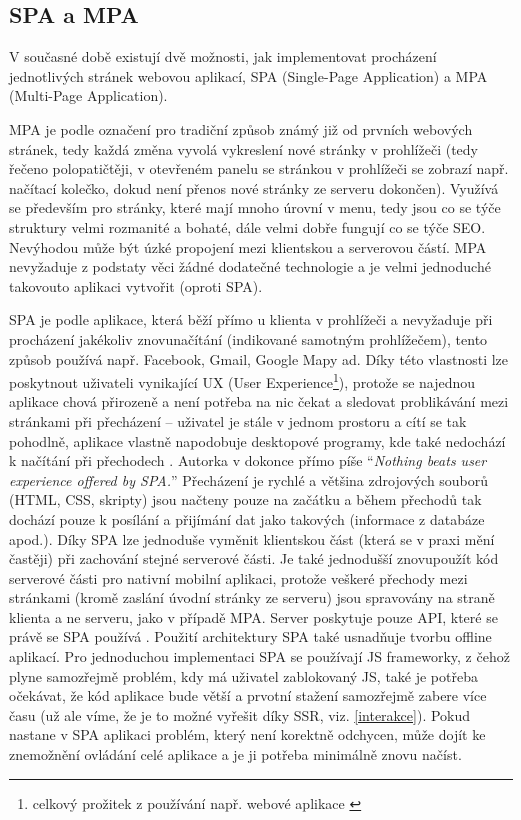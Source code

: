         \subsection{SPA a MPA}\label{spampa}
        V současné době existují dvě možnosti, jak implementovat procházení jednotlivých stránek webovou aplikací, SPA (Single-Page Application) a MPA (Multi-Page Application).
        
        MPA je podle \cite{spa1} označení pro tradiční způsob známý již od prvních webových stránek, tedy každá změna vyvolá vykreslení nové stránky v prohlížeči (tedy řečeno polopatičtěji, v otevřeném panelu se stránkou v prohlížeči se zobrazí např. načítací kolečko, dokud není přenos nové stránky ze serveru dokončen). Využívá se především pro stránky, které mají mnoho úrovní v menu, tedy jsou co se týče struktury velmi rozmanité a bohaté, dále velmi dobře fungují co se týče SEO. Nevýhodou může být úzké propojení mezi klientskou a serverovou částí. MPA nevyžaduje z podstaty věci žádné dodatečné technologie a je velmi jednoduché takovouto aplikaci vytvořit (oproti SPA).
        
        SPA je podle \cite{spa1} aplikace, která běží přímo u klienta v prohlížeči a nevyžaduje při procházení jakékoliv znovunačítání (indikované samotným prohlížečem), tento způsob používá např. Facebook, Gmail, Google Mapy ad. Díky této vlastnosti lze poskytnout uživateli vynikající UX (User Experience\footnote{celkový prožitek z používání např. webové aplikace \cite{ux}}), protože se najednou aplikace chová přirozeně a není potřeba na nic čekat a sledovat problikávání mezi stránkami při přecházení -- uživatel je stále v jednom prostoru a cítí se tak pohodlně, aplikace vlastně napodobuje desktopové programy, kde také nedochází k načítání při přechodech \cite{spa2}. Autorka v \cite{spa2} dokonce přímo píše \enquote{\textit{Nothing beats user experience offered by SPA.}} Přecházení je rychlé a většina zdrojových souborů (HTML, CSS, skripty) jsou načteny pouze na začátku a během přechodů tak dochází pouze k posílání a přijímání dat jako takových (informace z databáze apod.). Díky SPA lze jednoduše vyměnit klientskou část (která se v praxi mění častěji) při zachování stejné serverové části. Je také jednodušší znovupoužít kód serverové části pro nativní mobilní aplikaci, protože veškeré přechody mezi stránkami (kromě zaslání úvodní stránky ze serveru) jsou spravovány na straně klienta a ne serveru, jako v případě MPA. Server poskytuje pouze API, které se právě se SPA používá \cite{spa2}. Použití architektury SPA také usnadňuje tvorbu offline aplikací. Pro jednoduchou implementaci SPA se používají JS frameworky, z čehož plyne samozřejmě problém, kdy má uživatel zablokovaný JS, také je potřeba očekávat, že kód aplikace bude větší a prvotní stažení samozřejmě zabere více času (už ale víme, že je to možné vyřešit díky SSR, viz. \ref{interakce}). Pokud nastane v SPA aplikaci problém, který není korektně odchycen, může dojít ke znemožnění ovládání celé aplikace a je ji potřeba minimálně znovu načíst.

